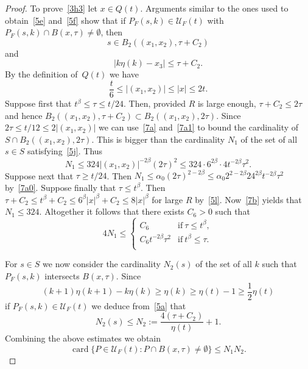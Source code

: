 \documentclass[12pt,a4paper]{amsart}
\theoremstyle{plain}
\theoremstyle{definition}
\theoremstyle{remark}
\def\cU{\mathcal U}
\def\card{\operatorname{card}}
\numberwithin{equation}{section}
\begin{document}
\begin{proof}
To prove~\eqref{3h3} let $x\in Q(t)$. Arguments similar to the ones used
to obtain~\eqref{5e} and~\eqref{5f} show that if $P_F(s,k)\in \cU_F(t)$ with 
$P_F(s,k)\cap B(x,\tau)\neq\emptyset$, then
\begin{equation}\label{5j}
s\in 
B_2((x_1,x_2), \tau+C_2)
\end{equation}
and 
\begin{equation}\label{5k}
|k\eta(k)-x_3|\leq \tau+C_2.
\end{equation}
By the definition of~$Q(t)$ we have
\begin{equation}\label{5l}
\frac{t}{6}\leq |(x_1,x_2)|\leq |x| \leq 2t .
\end{equation}
Suppose first that $t^\beta\leq\tau\leq t/24$. 
Then, provided $R$ is large enough,  $\tau+C_2\leq 2\tau$ and hence
$B_2((x_1,x_2), \tau+C_2)\subset B_2((x_1,x_2), 2\tau)$.
Since $2\tau\leq t/12\leq 2|(x_1,x_2)|$ we can use~\eqref{7a} and~\eqref{7a1}
to bound the cardinality of $S\cap B_2((x_1,x_2),2\tau)$.
This is bigger than 
the cardinality $N_1$ of the set of all $s\in S$ satisfying~\eqref{5j}. Thus
\begin{equation}\label{5m}
N_1\leq 324 |(x_1,x_2)|^{-2\beta} (2\tau)^2
\leq 324\cdot 6^{2\beta}\cdot  4 t^{-2\beta}\tau^2 .
\end{equation}
Suppose next that $\tau\geq t/24$. Then 
$N_1\leq \alpha_0 (2\tau)^{2-2\beta}\leq
\alpha_0 2^{2-2\beta} 24^{2\beta} t^{-2\beta}\tau^2$ by~\eqref{7a0}.
Suppose finally that $\tau\leq t^\beta$.
Then $\tau+C_2\leq t^\beta+C_2\leq 6^\beta|x|^\beta+C_2\leq 8|x|^\beta$ for large $R$
by~\eqref{5l}. Now~\eqref{7b} yields that $N_1\leq 324$. 
Altogether it follows that there exists $C_6>0$ such that 
\begin{equation}\label{5n2}
4 N_1\leq 
\begin{cases}
 C_6 &\text{if}\ \tau\leq t^{\beta},\\
\displaystyle C_6 t^{-2\beta}\tau^2   &\text{if}\ t^{\beta}\leq\tau .\\
\end{cases}
\end{equation}

For $s\in S$ we now consider the cardinality $N_2(s)$ of the set of all 
$k$ such that $P_F(s,k)$ intersects $B(x,\tau)$.
Since 
\begin{equation}\label{5m1}
(k+1)\eta(k+1)-k\eta(k)\geq \eta(k)\geq \eta(t)-1\geq \frac12 \eta(t)
\end{equation}
if $P_F(s,k)\in \cU_F(t)$ we deduce from~\eqref{5a} that
\begin{equation}\label{5n}
N_2(s)\leq N_2:=\frac{4(\tau+C_2)}{\eta(t)}  +1. 
\end{equation}
Combining the above estimates we obtain 
\begin{equation}\label{5n1}
\card\{P\in  \cU_F(t)\colon P\cap B(x,\tau)\neq\emptyset\}
\leq N_1 N_2.
\end{equation}


\end{proof}
\end{document}
